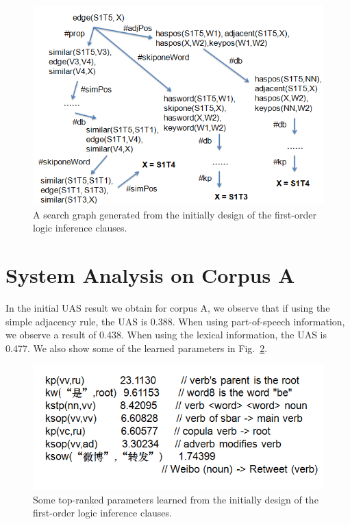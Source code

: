 \documentclass[11pt,letterpaper]{article}
\begin{document}
\begin{figure}[t]
\centerline{\includegraphics[scale=1]{search.png}}
\caption{A search graph generated from the initially design of the first-order logic inference clauses.}
\label{fig:search}
\end{figure}

\section{System Analysis on Corpus A}
In the initial UAS result we obtain for corpus A,
we observe that if using the simple adjacency rule,
the UAS is 0.388. When using part-of-speech
information, we observe a result of 0.438.
When using the lexical information,
the UAS is 0.477. We also show 
some of the learned parameters in Fig.~\ref{fig:params}.

\begin{figure}[t]
\centerline{\includegraphics[scale=1]{learnedparameters.png}}
\caption{Some top-ranked parameters learned from the initially design of the first-order logic inference clauses.}
\label{fig:params}
\end{figure}
\end{document}
